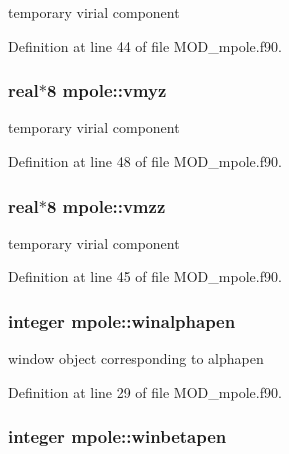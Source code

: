 temporary virial component 



Definition at line 44 of file M\-O\-D\-\_\-mpole.\-f90.

\hypertarget{classmpole_a2622f06370ae8e02ba34594ad55e93e0}{
\subsubsection[{vmyz}]{\setlength{\rightskip}{0pt plus 5cm}real$\ast$8 mpole\-::vmyz}}\label{classmpole_a2622f06370ae8e02ba34594ad55e93e0}


temporary virial component 



Definition at line 48 of file M\-O\-D\-\_\-mpole.\-f90.

\hypertarget{classmpole_affa102e85a9871ed8ffd4988cec33ee8}{
\subsubsection[{vmzz}]{\setlength{\rightskip}{0pt plus 5cm}real$\ast$8 mpole\-::vmzz}}\label{classmpole_affa102e85a9871ed8ffd4988cec33ee8}


temporary virial component 



Definition at line 45 of file M\-O\-D\-\_\-mpole.\-f90.

\hypertarget{classmpole_a691729318941f457d1a53afec3ed5e1a}{
\subsubsection[{winalphapen}]{\setlength{\rightskip}{0pt plus 5cm}integer mpole\-::winalphapen}}\label{classmpole_a691729318941f457d1a53afec3ed5e1a}


window object corresponding to alphapen 



Definition at line 29 of file M\-O\-D\-\_\-mpole.\-f90.

\hypertarget{classmpole_a4b4c29022b12253618b54b274326304f}{
\subsubsection[{winbetapen}]{\setlength{\rightskip}{0pt plus 5cm}integer mpole\-::winbetapen}}\label{classmpole_a4b4c29022b12253618b54b274326304f}


